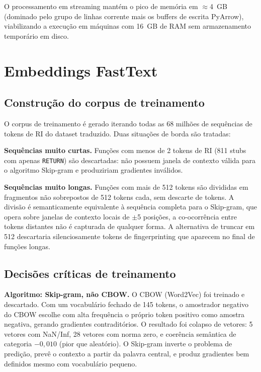 O processamento em streaming mantém o pico de memória em $\approx$4~GB
(dominado pelo grupo de linhas corrente mais os buffers de escrita PyArrow),
viabilizando a execução em máquinas com 16~GB de RAM sem armazenamento temporário
em disco.

\section{Embeddings FastText}
\label{sec:embeddings}

\subsection{Construção do corpus de treinamento}
\label{sub:corpus}

O corpus de treinamento é gerado iterando todas as 68 milhões de sequências
de tokens de RI do dataset traduzido. Duas situações de borda são tratadas:

\textbf{Sequências muito curtas.} Funções com menos de 2 tokens de RI (811
stubs com apenas \texttt{RETURN}) são descartadas: não possuem janela de
contexto válida para o algoritmo Skip-gram e produziriam gradientes inválidos.

\textbf{Sequências muito longas.} Funções com mais de 512 tokens são divididas em
fragmentos não sobrepostos de 512 tokens cada, sem descarte de tokens. A divisão é
semanticamente equivalente à sequência completa para o Skip-gram, que opera sobre
janelas de contexto locais de $\pm$5 posições, a co-ocorrência entre tokens
distantes não é capturada de qualquer forma. A alternativa de truncar em 512
descartaria silenciosamente tokens de fingerprinting que aparecem no final
de funções longas.

\subsection{Decisões críticas de treinamento}
\label{sub:fasttext-decisoes}

\textbf{Algoritmo: Skip-gram, não CBOW.} O CBOW (Word2Vec) foi treinado e
descartado. Com um vocabulário fechado de 145 tokens, o amostrador negativo do CBOW
escolhe com alta frequência o próprio token positivo como amostra negativa, gerando
gradientes contraditórios. O resultado foi colapso de vetores: 5 vetores com
NaN/Inf, 28 vetores com norma zero, e coerência semântica de categoria $-0{,}010$
(pior que aleatório). O Skip-gram inverte o problema de predição, prevê o
contexto a partir da palavra central, e produz gradientes bem definidos mesmo
com vocabulário pequeno.

